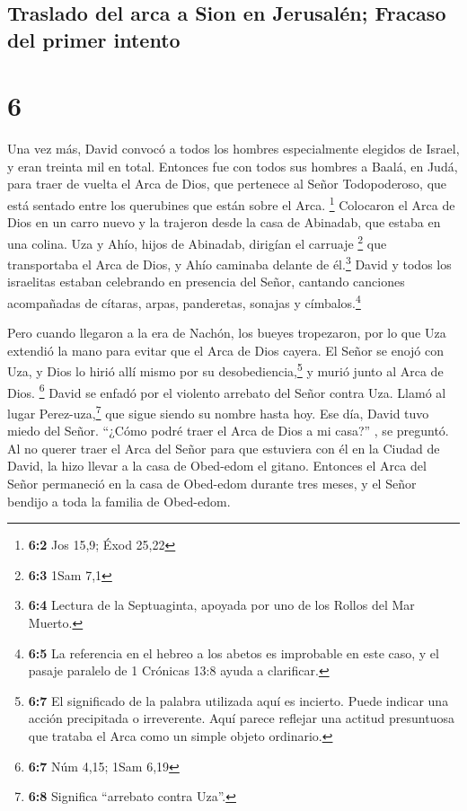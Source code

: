 \hypertarget{traslado-del-arca-a-sion-en-jerusaluxe9n-fracaso-del-primer-intento}{%
\subsection{Traslado del arca a Sion en Jerusalén; Fracaso del primer
intento}\label{traslado-del-arca-a-sion-en-jerusaluxe9n-fracaso-del-primer-intento}}

\hypertarget{section-5}{%
\section{6}\label{section-5}}

 Una vez más, David convocó a todos los hombres
especialmente elegidos de Israel, y eran treinta mil en total.
 Entonces fue con todos sus hombres a Baalá, en Judá, para
traer de vuelta el Arca de Dios, que pertenece al Señor Todopoderoso,
que está sentado entre los querubines que están sobre el Arca.
\footnote{\textbf{6:2} Jos 15,9; Éxod 25,22}  Colocaron el
Arca de Dios en un carro nuevo y la trajeron desde la casa de Abinadab,
que estaba en una colina. Uza y Ahío, hijos de Abinadab, dirigían el
carruaje \footnote{\textbf{6:3} 1Sam 7,1}  que
transportaba el Arca de Dios, y Ahío caminaba delante de él.\footnote{\textbf{6:4}
  Lectura de la Septuaginta, apoyada por uno de los Rollos del Mar
  Muerto.}  David y todos los israelitas estaban
celebrando en presencia del Señor, cantando canciones acompañadas de
cítaras, arpas, panderetas, sonajas y címbalos.\footnote{\textbf{6:5} La
  referencia en el hebreo a los abetos es improbable en este caso, y el
  pasaje paralelo de 1 Crónicas 13:8 ayuda a clarificar.}

 Pero cuando llegaron a la era de Nachón, los bueyes
tropezaron, por lo que Uza extendió la mano para evitar que el Arca de
Dios cayera.  El Señor se enojó con Uza, y Dios lo hirió
allí mismo por su desobediencia,\footnote{\textbf{6:7} El significado de
  la palabra utilizada aquí es incierto. Puede indicar una acción
  precipitada o irreverente. Aquí parece reflejar una actitud
  presuntuosa que trataba el Arca como un simple objeto ordinario.} y
murió junto al Arca de Dios. \footnote{\textbf{6:7} Núm 4,15; 1Sam 6,19}
 David se enfadó por el violento arrebato del Señor contra
Uza. Llamó al lugar Perez-uza,\footnote{\textbf{6:8} Significa
  ``arrebato contra Uza''.} que sigue siendo su nombre hasta hoy.
 Ese día, David tuvo miedo del Señor. ``¿Cómo podré traer
el Arca de Dios a mi casa?'' , se preguntó.  Al no querer
traer el Arca del Señor para que estuviera con él en la Ciudad de David,
la hizo llevar a la casa de Obed-edom el gitano. 
Entonces el Arca del Señor permaneció en la casa de Obed-edom durante
tres meses, y el Señor bendijo a toda la familia de Obed-edom.

